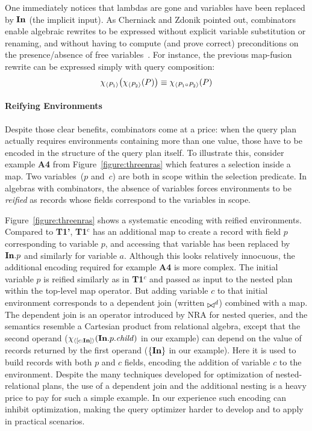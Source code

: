 One immediately notices that lambdas are gone and variables have been
replaced by $\textup{\textbf{{In}}}$ (the implicit input). As Cherniack and Zdonik
pointed out, combinators enable algebraic rewrites to be expressed
without explicit variable substitution or renaming, and without having
to compute (and prove correct) preconditions on the presence/absence
of free variables~\cite{cherniack1996rule}. For instance, the previous
map-fusion rewrite can be expressed simply with query composition:
\begin{align*}
  \chi_{\left\langle{P_1}\right\rangle}\!\left({\chi_{\left\langle{P_2}\right\rangle}\!\left({P}\right)}\right) \equiv \chi_{\left\langle{P_1 \circ P_2}\right\rangle}\!\left({P}\right)
\end{align*}

\vspace*{-0.2cm}
\paragraph*{Reifying Environments}

Despite those clear benefits, combinators come at a price: when the
query plan actually requires environments containing more than one
value, those have to be encoded in the structure of the query plan
itself. To illustrate this, consider example \textbf{A4} from
Figure~\ref{figure:threenras} which features a selection inside a map.
%
Two variables~($p$ and~$c$) are both in scope within the selection
predicate. In algebras with combinators, the absence of variables
forces environments to be \emph{reified} as records whose fields
correspond to the variables in scope.

Figure~\ref{figure:threenras} shows a systematic encoding with reified
environments.  Compared to \textbf{T1'}, \textbf{T1$^c$} has an
additional map to create a record with field $p$ corresponding to
variable $p$, and accessing that variable has been replaced by
$\textup{\textbf{{In}}}.p$ and similarly for variable $a$. Although this looks
relatively innocuous, the additional encoding required for example
\textbf{A4} is more complex. The initial variable $p$ is reified
similarly as in \textbf{T1$^c$} and passed as input to the nested plan
within the top-level map operator. But adding variable $c$ to that
initial environment corresponds to a dependent join (written
$\qdjoinop$) combined with a map. The dependent join is an operator
introduced by NRA for nested queries, and the semantics resemble a
Cartesian product from relational algebra, except that the second
operand ($\chi_{\left\langle{[c:\textup{\textbf{{In}}}]}\right\rangle}\!\left({\textup{\textbf{{In}}}.p.\mathit{child}}\right)$ in our example) can
depend on the value of records returned by the first operand
($\{\textup{\textbf{{In}}}\}$ in our example). Here it is used to build records with
both $p$ and $c$ fields, encoding the addition of variable $c$ to the
environment. Despite the many techniques developed for optimization of
nested-relational plans, the use of a dependent join and the
additional nesting is a heavy price to pay for such a simple
example. In our experience such encoding can inhibit optimization,
making the query optimizer harder to develop and to apply in practical
scenarios.

